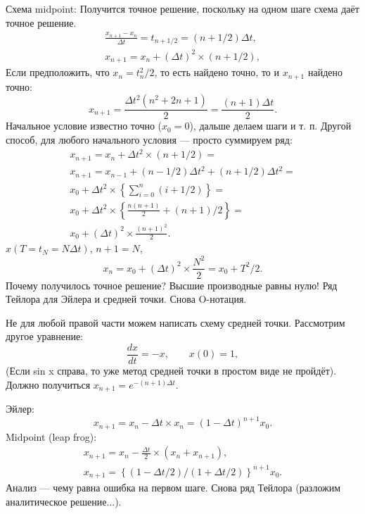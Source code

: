 \documentclass{book}
\begin{document}
Схема midpoint:
Получится точное решение, поскольку на одном шаге схема даёт точное решение.
\begin{eqnarray}
    \frac{x_{n+1} - x_n}{\Delta t} = t_{n+1/2} = (n + 1/2) \Delta t, \\
    x_{n + 1} = x_n + (\Delta t )^2 \times (n + 1/2),
\end{eqnarray}
Если предположить, что $x_n = t_n^2 / 2$, то есть найдено точно, то и $x_{n + 1}$ найдено точно:
\begin{equation}
    x_{n + 1} = \frac{\Delta t^2 (n^2 + 2 n + 1)}{2} = \frac{(n + 1) \Delta t}{2}.
\end{equation}
Начальное условие известно точно ($x_0 = 0$), дальше делаем шаги и т. п.
Другой способ, для любого начального условия --- просто суммируем ряд:
\begin{eqnarray}
    x_{n + 1} = x_n + \Delta t^2 \times (n + 1/2) = \\
    x_{n + 1} = x_{n - 1} + (n - 1 /2) \Delta t^2 + (n + 1 / 2) \Delta t^2 = \\
    x_0 + \Delta t^2 \times \left\{ \sum_{i = 0}^n (i + 1/2) \right\} = \\
    x_0 + \Delta t^2 \times \left\{ \frac{n (n + 1)}{2} + (n + 1) / 2 \right\} = \\
    x_0 + (\Delta t)^2 \times \frac{(n + 1)^2}{2}.
\end{eqnarray}
$x(T = t_N = N \Delta t)$, $n + 1 = N$,
\begin{equation}
    x_n = x_0 +(\Delta t)^2 \times \frac{N^2}{2} = x_0 + T^2 / 2.
\end{equation}
Почему получилось точное решение? Высшие производные равны нулю! Ряд Тейлора для Эйлера и средней
точки. Снова O-нотация.

Не для любой правой части можем написать схему средней точки. Рассмотрим другое уравнение:
\begin{equation}
    \frac{dx}{dt} = -x, \qquad x(0) = 1,
\end{equation}
(Если sin x справа, то уже метод средней точки в простом виде не пройдёт).
Должно получиться $x_{n+1} = e^{-(n+1) \Delta t}$.

Эйлер:
\begin{equation}
    x_{n+1} = x_{n} - \Delta t \times x_n = (1 - \Delta t)^{n + 1} x_0.
\end{equation}
Midpoint (leap frog):
\begin{eqnarray}
    x_{n+1} = x_{n} - \frac{\Delta t}{2} \times (x_n + x_{n+1}), \\
    x_{n+1} = \left\{ (1 - \Delta t / 2) / (1 + \Delta t / 2) \right\}^{n+1} x_0.
\end{eqnarray}
Анализ --- чему равна ошибка на первом шаге. Снова ряд Тейлора (разложим аналитическое решение...).
\end{document}
